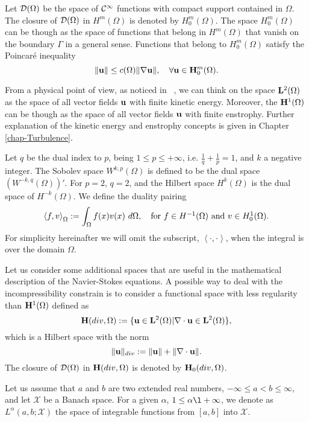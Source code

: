 Let $\mathcal{D}(\Omega)$ be the space of $\mathcal{C}^\infty$ functions with compact support contained in $\Omega$. The closure of $\mathcal{D}(\Omega)$ in $H^m(\Omega)$ is denoted by $H^m_0(\Omega)$. The space $H^m_0(\Omega)$ can be though as the space of functions that belong in $H^m(\Omega)$ that vanish on the boundary $\Gamma$ in a general sense. Functions that belong to $H^m_0(\Omega)$ satisfy the Poincaré inequality
\begin{equation}
\label{eq-Poincare_inequality}
\|{\bf u}\|\leq c(\Omega)\|\nabla{\bf u}\|,\quad\forall{\bf u}\in{\bf H}^m_0(\Omega).
\end{equation}

From a physical point of view, as noticed in ~\cite{foias_navier-stokes_2001}, we can think on the space ${\bf L}^2(\Omega)$ as the space of all vector fields ${\bf u}$ with finite kinetic energy. Moreover, the ${\bf H}^1(\Omega)$ can be though as the space of all vector fields ${\bf u}$ with finite enstrophy. Further explanation of the kinetic energy and enstrophy concepts is given in Chapter \ref{chap-Turbulence}.

Let $ q $ be the dual index to $ p $, being $ 1\le p\le+\infty $, i.e. $ \frac{1}{q}+\frac{1}{p}=1 $, and $ k $ a negative integer. The Sobolev space $ W^{k,p}(\Omega) $ is defined to be the dual space $ \left(W^{-k,q}(\Omega)\right)' $. For $ p=2 $, $ q=2 $, and the Hilbert space $ H^k(\Omega) $ is the dual space of $ H^{-k}(\Omega) $. We define the duality pairing 
$$ \left\langle f,v\right\rangle_\Omega:=\int_{\Omega}f(x)v(x)\ d\Omega,\quad\mbox{for $ f\in H^{-1}(\Omega) $ and $ v\in H^1_0(\Omega) $}. $$
For simplicity hereinafter we will omit the subscript, $ \left\langle\cdot,\cdot\right\rangle $, when the integral is over the domain $ \Omega $.

Let us consider some additional spaces that are useful in the mathematical description of the Navier-Stokes equations. A possible way to deal with the incompressibility constrain  is to consider a functional space with less regularity than ${\bf H}^1(\Omega)$ defined as
$${\bf H}(div,\Omega):=\{{\bf u}\in{\bf L}^2(\Omega)|\nabla\cdot{\bf u}\in{\bf L}^2(\Omega)\},$$
which is a Hilbert space with the norm
$$\|{\bf u}\|_{div}:=\|{\bf u}\|+\|\nabla\cdot{\bf u}\|.$$
The closure of $\mathcal{D}(\Omega)$ in ${\bf H}(div,\Omega)$ is denoted by ${\bf H}_0(div,\Omega)$.

Let us assume that $ a $ and $ b $ are two extended real numbers, $ -\infty\le a < b\le\infty $, and let $ \mathcal{X} $ be a Banach space. For a given $ \alpha $, $ 1\le\alpha\l +\infty $, we denote as $ L^\alpha(a,b;\mathcal{X}) $ the space of integrable functions from $ \left[a,b\right] $ into $ \mathcal{X} $.
